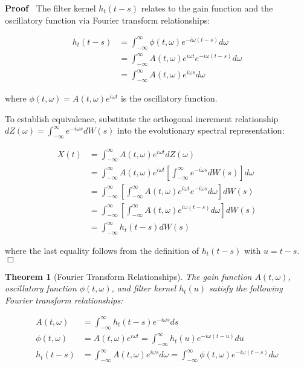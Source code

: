 \documentclass{article}
\newenvironment{proof}{\noindent\textbf{Proof\ }}{\hspace*{\fill}$\Box$\medskip}
\newtheorem{theorem}{Theorem}
\begin{document}
\begin{proof}
  The filter kernel $h_t  (t - s)$ relates to the gain function and the
  oscillatory function via Fourier transform relationships:
  
  \begin{align}
    h_t  (t - s) & = \int_{- \infty}^{\infty} \phi (t, \omega) e^{- i \omega
    (t - s)} d \omega \\
    & = \int_{- \infty}^{\infty} A (t, \omega) e^{i \omega t} e^{- i \omega
    (t - s)} d \omega \\
    & = \int_{- \infty}^{\infty} A (t, \omega) e^{i \omega s} d \omega 
  \end{align}
  
  where $\phi (t, \omega) = A (t, \omega) e^{i \omega t}$ is the oscillatory
  function.
  
  To establish equivalence, substitute the orthogonal increment relationship
  $dZ (\omega) = \int_{- \infty}^{\infty} e^{- i \omega s} dW (s)$ into the
  evolutionary spectral representation:
  
  \begin{align}
    X (t) & = \int_{- \infty}^{\infty} A (t, \omega) e^{i \omega t} dZ
    (\omega) \\
    & = \int_{- \infty}^{\infty} A (t, \omega) e^{i \omega t} \left[ \int_{-
    \infty}^{\infty} e^{- i \omega s} dW (s) \right] d \omega \\
    & = \int_{- \infty}^{\infty} \left[ \int_{- \infty}^{\infty} A (t,
    \omega) e^{i \omega t} e^{- i \omega s} d \omega \right] dW (s) \\
    & = \int_{- \infty}^{\infty} \left[ \int_{- \infty}^{\infty} A (t,
    \omega) e^{i \omega (t - s)} d \omega \right] dW (s) \\
    & = \int_{- \infty}^{\infty} h_t  (t - s) dW (s) 
  \end{align}
  
  where the last equality follows from the definition of $h_t  (t - s)$ with
  $u = t - s$.
\end{proof}

\begin{theorem}
  [Fourier Transform Relationships] The gain function $A (t, \omega)$,
  oscillatory function $\phi (t, \omega)$, and filter kernel $h_t (u)$ satisfy
  the following Fourier transform relationships:
  
  \begin{align}
    A (t, \omega) & = \int_{- \infty}^{\infty} h_t  (t - s) e^{- i \omega s}
    ds \\
    \phi (t, \omega) & = A (t, \omega) e^{i \omega t} = \int_{-
    \infty}^{\infty} h_t (u) e^{- i \omega (t - u)} du \\
    h_t  (t - s) & = \int_{- \infty}^{\infty} A (t, \omega) e^{i \omega s} d
    \omega = \int_{- \infty}^{\infty} \phi (t, \omega) e^{- i \omega (t - s)}
    d \omega 
  \end{align}
\end{theorem}
\end{document}
